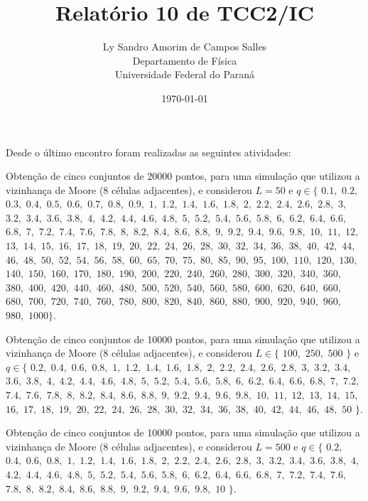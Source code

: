 \documentclass[12pt,a4paper,final]{article}
\title{Relatório 10 de TCC2/IC}
\author{Ly Sandro Amorim de Campos Salles\\Departamento de Física\\Universidade Federal do Paraná}
\date{\today}
\begin{document}
	\maketitle

  Desde o último encontro foram realizadas as seguintes atividades:

  Obtenção de cinco conjuntos de 20000 pontos, para uma simulação que utilizou a vizinhança de Moore (8 células adjacentes), e considerou $L=50$ e $q\in\{$ 
  $0.1,$ $0.2,$ $0.3,$ $0.4,$ $0.5,$ $0.6,$ $0.7,$ $0.8,$ $0.9,$
  $1,$ $1.2,$ $1.4,$ $1.6,$ $1.8,$ 
  $2,$ $2.2,$ $2.4,$ $2.6,$ $2.8,$ 
  $3,$ $3.2,$ $3.4,$ $3.6,$ $3.8,$
  $4,$ $4.2,$ $4.4,$ $4.6,$ $4.8,$
  $5,$ $5.2,$ $5.4,$ $5.6,$ $5.8,$
  $6,$ $6.2,$ $6.4,$ $6.6,$ $6.8,$
  $7,$ $7.2,$ $7.4,$ $7.6,$ $7.8,$
  $8,$ $8.2,$ $8.4,$ $8.6,$ $8.8,$
  $9,$ $9.2,$ $9.4,$ $9.6,$ $9.8,$ $10,$
  $11,$ $12,$ $13,$ $14,$ $15,$ $16,$ $17,$ $18,$ $19,$ $20,$
  $22,$ $24,$ $26,$ $28,$ $30,$ $32,$ $34,$ $36,$ $38,$ $40,$
  $42,$ $44,$ $46,$ $48,$ $50,$ $52,$ $54,$ $56,$ $58,$ $60,$
  $65,$ $70,$ $75,$ $80,$ $85,$ $90,$ $95,$ $100,$ $110,$
  $120,$ $130,$ $140,$ $150,$ $160,$ $170,$ $180,$ $190,$
  $200,$ $220,$ $240,$ $260,$ $280,$ $300,$ $320,$ $340,$ $360,$ $380,$
  $400,$ $420,$ $440,$ $460,$ $480,$ $500,$ $520,$ $540,$ $560,$ $580,$
  $600,$ $620,$ $640,$ $660,$ $680,$ $700,$ $720,$ $740,$ $760,$ $780,$
  $800,$ $820,$ $840,$ $860,$ $880,$ $900,$ $920,$ $940,$ $960,$ $980,$
  $1000\}$. 

  Obtenção de cinco conjuntos de 10000 pontos, para uma simulação que utilizou a vizinhança de Moore (8 células adjacentes), e considerou $L\in\{$ $100,$ $250,$ $500$ $\}$  e $q\in\{$ 
  $0.2,$ $0.4,$ $0.6,$ $0.8,$
  $1,$ $1.2,$ $1.4,$ $1.6,$ $1.8,$ 
  $2,$ $2.2,$ $2.4,$ $2.6,$ $2.8,$ 
  $3,$ $3.2,$ $3.4,$ $3.6,$ $3.8,$
  $4,$ $4.2,$ $4.4,$ $4.6,$ $4.8,$
  $5,$ $5.2,$ $5.4,$ $5.6,$ $5.8,$
  $6,$ $6.2,$ $6.4,$ $6.6,$ $6.8,$
  $7,$ $7.2,$ $7.4,$ $7.6,$ $7.8,$
  $8,$ $8.2,$ $8.4,$ $8.6,$ $8.8,$
  $9,$ $9.2,$ $9.4,$ $9.6,$ $9.8,$ $10,$
  $11,$ $12,$ $13,$ $14,$ $15,$ $16,$ $17,$ $18,$ $19,$ $20,$
  $22,$ $24,$ $26,$ $28,$ $30,$ $32,$ $34,$ $36,$ $38,$ $40,$
  $42,$ $44,$ $46,$ $48,$ $50$ $\}$. 

  Obtenção de cinco conjuntos de 10000 pontos, para uma simulação que utilizou a vizinhança de Moore (8 células adjacentes), e considerou $L=500$  e $q\in\{$ 
  $0.2,$ $0.4,$ $0.6,$ $0.8,$
  $1,$ $1.2,$ $1.4,$ $1.6,$ $1.8,$ 
  $2,$ $2.2,$ $2.4,$ $2.6,$ $2.8,$ 
  $3,$ $3.2,$ $3.4,$ $3.6,$ $3.8,$
  $4,$ $4.2,$ $4.4,$ $4.6,$ $4.8,$
  $5,$ $5.2,$ $5.4,$ $5.6,$ $5.8,$
  $6,$ $6.2,$ $6.4,$ $6.6,$ $6.8,$
  $7,$ $7.2,$ $7.4,$ $7.6,$ $7.8,$
  $8,$ $8.2,$ $8.4,$ $8.6,$ $8.8,$
  $9,$ $9.2,$ $9.4,$ $9.6,$ $9.8,$ $10$ $\}$. 
\end{document}
